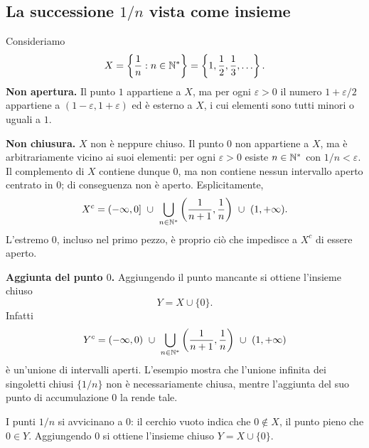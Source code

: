 \subsection{La successione \texorpdfstring{$1/n$}{1/n} vista come insieme}

Consideriamo
\[
  X=\left\{\frac1n:n\in\mathbb{N}^*\right\}
   =\left\{1,\frac12,\frac13,\ldots\right\}.
\]
\textbf{Non apertura.} Il punto $1$ appartiene a $X$, ma per ogni $\varepsilon>0$ il numero $1+\varepsilon/2$ appartiene a $(1-\varepsilon,1+\varepsilon)$ ed è esterno a $X$, i cui elementi sono tutti minori o uguali a $1$.

\textbf{Non chiusura.} $X$ non è neppure chiuso. Il punto $0$ non appartiene a $X$, ma è arbitrariamente vicino ai suoi elementi: per ogni $\varepsilon>0$ esiste $n\in\mathbb{N}^*$ con $1/n<\varepsilon$. Il complemento di $X$ contiene dunque $0$, ma non contiene nessun intervallo aperto centrato in $0$; di conseguenza non è aperto. Esplicitamente,
\[
  X^c=(-\infty,0]\ \cup\
  \bigcup_{n\in\mathbb{N}^*}\left(\frac1{n+1},\frac1n\right)
  \ \cup\ (1,+\infty).
\]
L'estremo $0$, incluso nel primo pezzo, è proprio ciò che impedisce a $X^c$ di essere aperto.

\textbf{Aggiunta del punto $0$.} Aggiungendo il punto mancante si ottiene l'insieme chiuso
\[
  Y=X\cup\{0\}.
\]
Infatti
\[
  Y^c=(-\infty,0)\ \cup\
  \bigcup_{n\in\mathbb{N}^*}\left(\frac1{n+1},\frac1n\right)
  \ \cup\ (1,+\infty)
\]
è un'unione di intervalli aperti. L'esempio mostra che l'unione infinita dei singoletti chiusi $\{1/n\}$ non è necessariamente chiusa, mentre l'aggiunta del suo punto di accumulazione $0$ la rende tale.

\begin{schema}
\par\smallskip I punti $1/n$ si avvicinano a $0$: il cerchio vuoto indica che $0\notin X$, il punto pieno che $0\in Y$. Aggiungendo $0$ si ottiene l'insieme chiuso $Y=X\cup\{0\}$.
\end{schema}

